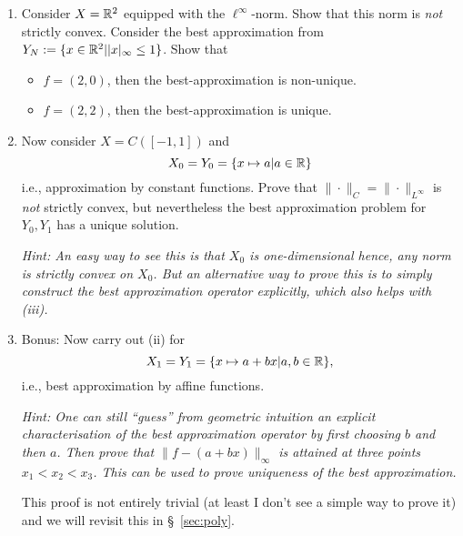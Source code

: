 \begin{exercise}
  \label{exr:prelims:bestapprox_maxnorms}
  \begin{enumerate}\ilist
  \item Consider $X = \mathbb{R}^2$ equipped with the $\ell^\infty$-norm. Show that
  this norm is {\em not} strictly convex. Consider the best approximation
  from $Y_N := \{ x \in \mathbb{R}^2 | |x|_\infty \leq 1 \}$. Show that
  \begin{itemize}
    \item $f = (2, 0)$, then the best-approximation is non-unique.
    \item $f = (2,2)$, then the best-approximation is unique.
  \end{itemize}

  \item Now consider $X = C([-1,1])$ and
  \[
    X_0 = Y_0 = \{ x \mapsto a | a \in \mathbb{R} \}
  \]
  i.e., approximation by constant functions. Prove that $\|\cdot\|_C =
  \|\cdot\|_{L^\infty}$ is {\em not} strictly convex, but nevertheless the best
  approximation problem for $Y_0, Y_1$ has a unique solution.

  {\it Hint: An easy way to see this is that $X_0$ is one-dimensional hence,
  any norm is strictly convex on $X_0$. But an alternative way to prove this is
  to simply construct the best approximation operator explicitly, which also
  helps with (iii).}

  \item {Bonus: } Now carry out (ii) for
  \[
      X_1 = Y_1 = \{ x \mapsto a + bx | a,b \in \mathbb{R} \},
  \]
  i.e., best approximation by affine functions.

  {\it Hint: One can still ``guess'' from geometric intuition an explicit characterisation of the
  best approximation operator by first choosing $b$ and then $a$. Then prove
  that $\|f - (a+bx)\|_\infty$ is attained at three points $x_1 < x_2 < x_3$.
  This can be used to prove uniqueness of the best approximation.

  This proof is not entirely trivial (at least I don't see a simple way to
  prove it) and we will revisit this in \S~\ref{sec:poly}.
  } \qedhere
  \end{enumerate}
\end{exercise}


